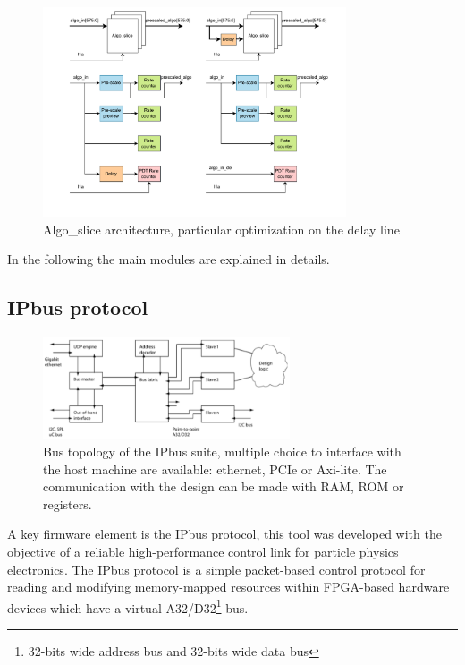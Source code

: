 \documentclass[../../main.tex]{subfiles}
\begin{document}
\begin{figure}[h]
    \centering
    \includegraphics[width=0.8\textwidth]{sections/06/Images/Algo_slice_mod.pdf}
    \caption{Algo\_slice architecture, particular optimization on the delay line}
    \label{fig:Algo_slice}
\end{figure}

In the following the main modules are explained in details.

\subsection{IPbus protocol}
\label{sec:IPbus}

\begin{figure}[h]
    \centering
    \includegraphics[width=0.65\textwidth]{sections/06/Images/bus_topology.png}
    \caption{Bus topology of the IPbus suite, multiple choice to interface with the host machine are available: ethernet, PCIe or Axi-lite. The communication with the design can be made with RAM, ROM or registers.   }
    \label{fig:Ipbus}
\end{figure}

A key firmware element is the IPbus protocol\cite{IPbus}, this tool was developed with the objective of a reliable high-performance control link for particle physics electronics. The IPbus protocol is a simple packet-based control protocol for reading and modifying memory-mapped resources within FPGA-based hardware devices which have a virtual A32/D32\footnote{32-bits wide address bus and 32-bits wide data bus} bus.   
\end{document}
